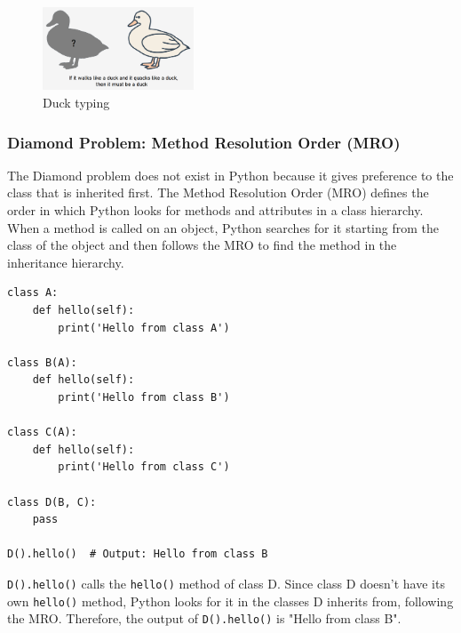 \begin{figure}[h!]
    \centering
    \includegraphics[width=0.4\textwidth]{images/twoDucks.png}
    \caption{Duck typing}
    \label{fig:example-1}
\end{figure}



\newpage
\subsubsection{Diamond Problem: Method Resolution Order (MRO)}
The Diamond problem does not exist in Python because it gives preference to the class that is inherited first. The Method Resolution Order (MRO) defines the order in which Python looks for methods and attributes in a class hierarchy. When a method is called on an object, Python searches for it starting from the class of the object and then follows the MRO to find the method in the inheritance hierarchy.

\begin{codebox}
\begin{verbatim}
class A:
    def hello(self):
        print('Hello from class A')
 
class B(A):
    def hello(self):
        print('Hello from class B')
 
class C(A):
    def hello(self):
        print('Hello from class C')
 
class D(B, C):
    pass

D().hello()  # Output: Hello from class B
\end{verbatim}
\end{codebox}

\texttt{D().hello()} calls the \texttt{hello()} method of class D. Since class D doesn't have its own \texttt{hello()} method, Python looks for it in the classes D inherits from, following the MRO. Therefore, the output of \texttt{D().hello()} is "Hello from class B".

